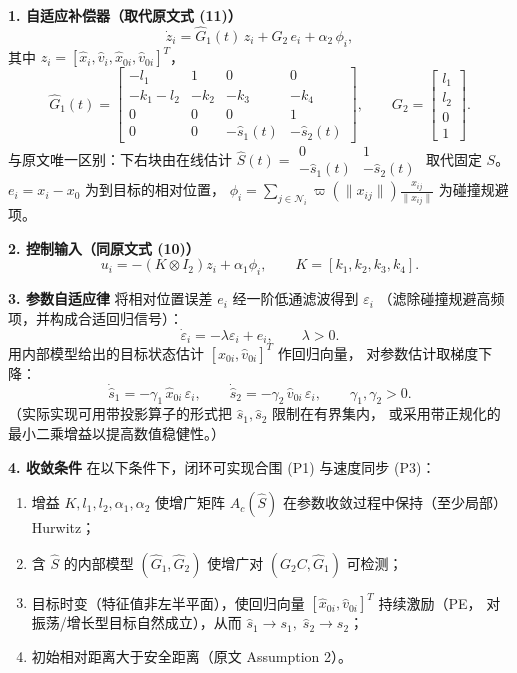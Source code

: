 \medskip
\textbf{1. 自适应补偿器（取代原文式 (11)）}
\[
\dot z_i = \hat G_1(t)\, z_i + G_2\, e_i + \alpha_2\,\phi_i,
\]
其中 $z_i=[\hat x_i,\hat v_i,\hat x_{0i},\hat v_{0i}]^T$，
\[
\hat G_1(t)=
\begin{bmatrix}
-l_1 & 1 & 0 & 0\\
-k_1-l_2 & -k_2 & -k_3 & -k_4\\
0 & 0 & 0 & 1\\
0 & 0 & -\hat s_1(t) & -\hat s_2(t)
\end{bmatrix},\qquad
G_2=\begin{bmatrix}l_1\\l_2\\0\\1\end{bmatrix}.
\]
与原文唯一区别：下右块由在线估计
$\hat S(t)=\begin{smallmatrix}0&1\\-\hat s_1(t)&-\hat s_2(t)\end{smallmatrix}$
取代固定 $S$。$e_i=x_i-x_0$ 为到目标的相对位置，
$\phi_i=\sum_{j\in\mathcal N_i}\varpi(\|x_{ij}\|)\frac{x_{ij}}{\|x_{ij}\|}$ 为碰撞规避项。

\medskip
\textbf{2. 控制输入（同原文式 (10)）}
\[
u_i = -(K\otimes I_2)z_i + \alpha_1 \phi_i,\qquad
K=[k_1,k_2,k_3,k_4].
\]

\medskip
\textbf{3. 参数自适应律}
将相对位置误差 $e_i$ 经一阶低通滤波得到 $\varepsilon_i$
（滤除碰撞规避高频项，并构成合适回归信号）：
\[
\dot\varepsilon_i = -\lambda \varepsilon_i + e_i,\qquad \lambda>0.
\]
用内部模型给出的目标状态估计 $[\hat x_{0i},\hat v_{0i}]^T$ 作回归向量，
对参数估计取梯度下降：
\[
\dot{\hat s}_1 = -\gamma_1\,\hat x_{0i}\,\varepsilon_i,\qquad
\dot{\hat s}_2 = -\gamma_2\,\hat v_{0i}\,\varepsilon_i,
\qquad \gamma_1,\gamma_2>0.
\]
（实际实现可用带投影算子的形式把 $\hat s_1,\hat s_2$ 限制在有界集内，
或采用带正规化的最小二乘增益以提高数值稳健性。）

\medskip
\textbf{4. 收敛条件}
在以下条件下，闭环可实现合围 (P1) 与速度同步 (P3)：
\begin{enumerate}
  \item 增益 $K,l_1,l_2,\alpha_1,\alpha_2$ 使增广矩阵 $A_c(\hat S)$
    在参数收敛过程中保持（至少局部）Hurwitz；
  \item 含 $\hat S$ 的内部模型 $(\hat G_1,\hat G_2)$ 使增广对
    $(G_2C,\hat G_1)$ 可检测；
  \item 目标时变（特征值非左半平面），使回归向量
    $[\hat x_{0i},\hat v_{0i}]^T$ 持续激励（PE，
    对振荡/增长型目标自然成立），从而 $\hat s_1\to s_1,\;\hat s_2\to s_2$；
  \item 初始相对距离大于安全距离（原文 Assumption 2）。
\end{enumerate}

